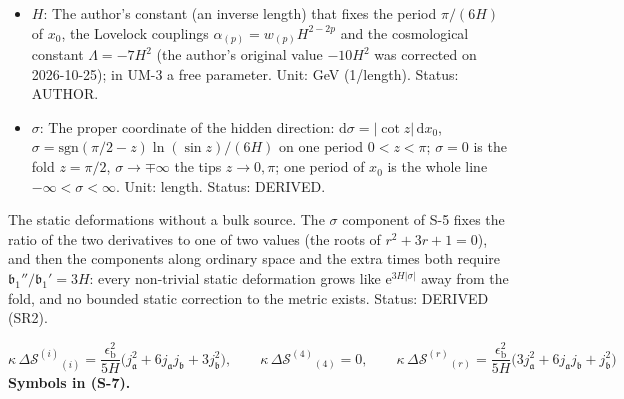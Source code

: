 \documentclass[
  10pt,
]{article}
\begin{document}
\begin{itemize}
  Value: 2.718281828. Status: STANDARD.
\item
  \(H\): The author's constant (an inverse length) that fixes the period
  \(\pi/(6H)\) of \(x_0\), the Lovelock couplings
  \(\alpha_{(p)} = w_{(p)}H^{2-2p}\) and the cosmological constant
  \(\Lambda = -7H^2\) (the author's original value \(-10H^2\) was
  corrected on 2026-10-25); in UM-3 a free parameter. Unit: GeV
  (1/length). Status: AUTHOR.
\item
  \(\sigma\): The proper coordinate of the hidden direction:
  \(\mathrm{d}\sigma = \lvert\cot z\rvert\,\mathrm{d}x_0\),
  \(\sigma = \mathrm{sgn}(\pi/2 - z)\ln(\sin z)/(6H)\) on one period
  \(0 < z < \pi\); \(\sigma = 0\) is the fold \(z = \pi/2\),
  \(\sigma \to \mp\infty\) the tips \(z \to 0, \pi\); one period of
  \(x_0\) is the whole line \(-\infty < \sigma < \infty\). Unit: length.
  Status: DERIVED.
\end{itemize}

The static deformations without a bulk source. The \(\sigma\) component
of S-5 fixes the ratio of the two derivatives to one of two values (the
roots of \(r^2 + 3r + 1 = 0\)), and then the components along ordinary
space and the extra times both require
\(\mathfrak{b}_1''/\mathfrak{b}_1' = 3H\): every non-trivial static
deformation grows like \(\mathrm{e}^{3H\lvert\sigma\rvert}\) away from
the fold, and no bounded static correction to the metric exists. Status:
DERIVED (SR2).

\[
\kappa\,\Delta\mathcal{S}^{(i)}{}_{(i)} = \frac{\epsilon_{\mathrm{b}}^2}{5H}\big(j_{\mathfrak{a}}^2 + 6j_{\mathfrak{a}}j_{\mathfrak{b}} + 3j_{\mathfrak{b}}^2\big),\qquad
\kappa\,\Delta\mathcal{S}^{(4)}{}_{(4)} = 0,\qquad
\kappa\,\Delta\mathcal{S}^{(r)}{}_{(r)} = \frac{\epsilon_{\mathrm{b}}^2}{5H}\big(3j_{\mathfrak{a}}^2 + 6j_{\mathfrak{a}}j_{\mathfrak{b}} + j_{\mathfrak{b}}^2\big) \tag{S-7}
\] \textbf{Symbols in (S-7).}
\end{document}
